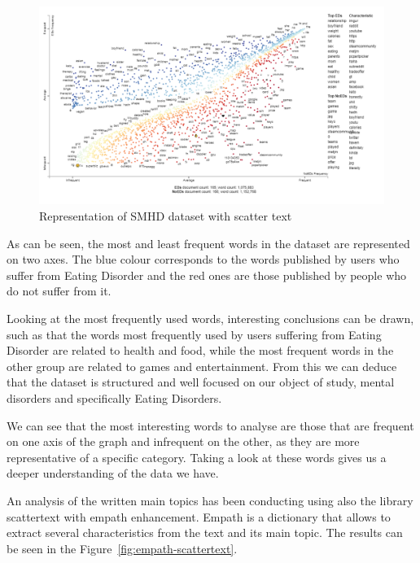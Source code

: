 \begin{figure}[!htp]
    \centering
    \includegraphics[scale=0.7]{img/detection/scattertext.png}
    \caption{Representation of SMHD dataset with scatter text}
    \label{fig:scattertext}
\end{figure}

As can be seen, the most and least frequent words in the dataset are represented on two axes. The blue colour corresponds to the words published by users who suffer from Eating Disorder and the red ones are those published by people who do not suffer from it. 

Looking at the most frequently used words, interesting conclusions can be drawn, such as that the words most frequently used by users suffering from Eating Disorder are related to health and food, while the most frequent words in the other group are related to games and entertainment. From this we can deduce that the dataset is structured and well focused on our object of study, mental disorders and specifically Eating Disorders.

We can see that the most interesting words to analyse are those that are frequent on one axis of the graph and infrequent on the other, as they are more representative of a specific category. Taking a look at these words gives us a deeper understanding of the data we have.

An analysis of the written main topics has been conducting using also the library scattertext with empath enhancement. Empath is a dictionary that allows to extract several characteristics from the text and its main topic. The results can be seen in the Figure~\ref{fig:empath-scattertext}.

